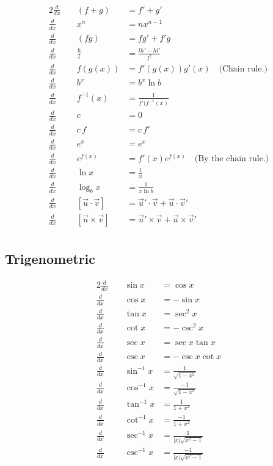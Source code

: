 \documentclass[knowledge]{mathnotes}
\def \ddx { \frac{d}{dx} }
\begin{document}
\begin{alignat*}{2}
  \ddx&\;& (f + g) &= f' + g' \\
  \ddx&& x^n &= nx^{n - 1} \\
  \ddx&& (fg) &= fg' + f'g \\
  \ddx&& \frac{h}{l} &= \frac{l h' - h l'}{l^2} \\
  \ddx&& f(g(x)) &= f'(g(x)) g'(x) \quad\text{(Chain rule.)} \\
  \ddx&& b^x &= b^x \ln b \\
  \ddx&& f^{-1}(x) &= \frac{1}{f'(f^{-1}(x)} \\
  \ddx&& c &= 0 \\
  \ddx&& c\,f &= c\,f' \\
  \ddx&& e^x &= e^x \\
  \ddx&& e^{f(x)} &= f'(x) e^{f(x)} \quad\text{(By the chain rule.)}  \\
  \ddx&& \ln x &= \frac{1}{x} \\
  \ddx&& \log_b x &= \frac{1}{x \ln b} \\
  \ddx&& [\vec u \cdot \vec v] &= \vec u' \cdot \vec v + \vec u \cdot \vec v' \\
  \ddx&& [\vec u \times \vec v] &= \vec u' \times \vec v + \vec u \times \vec v' \\
\end{alignat*}

\subsection{Trigenometric}
\begin{alignat*}{2}
  \ddx&\;& \sin x &= \cos x \\
  \ddx&& \cos x &= -\sin x \\
  \ddx&& \tan x &= \sec^2 x \\
  \ddx&& \cot x &= -\csc^2 x \\
  \ddx&& \sec x &=  \sec x \tan x \\
  \ddx&& \csc x &=  -\csc x \cot x \\
  \ddx&& \sin^{-1} x &= \frac{ 1}{\sqrt{1 - x^2}} \\
  \ddx&& \cos^{-1} x &= \frac{-1}{\sqrt{1 - x^2}} \\
  \ddx&& \tan^{-1} x &= \frac{ 1}{1 + x^2} \\
  \ddx&& \cot^{-1} x &= \frac{-1}{1 + x^2} \\
  \ddx&& \sec^{-1} x &= \frac{ 1}{|x| \sqrt{x^2 - 1}} \\
  \ddx&& \csc^{-1} x &= \frac{-1}{|x| \sqrt{x^2 - 1}} \\
\end{alignat*}
\end{document}
